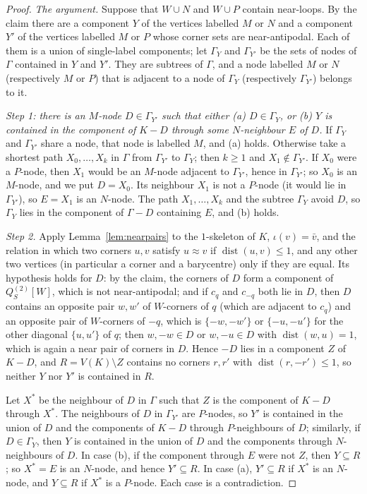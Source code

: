 \documentclass[11pt,letterpaper]{article}
\theoremstyle{definition}
\DeclareMathOperator{\dist}{dist}
\begin{document}
\begin{proof}
\emph{The argument.} Suppose that $W\cup N$ and $W\cup P$ contain near-loops. By the claim there are
a component $Y$ of the vertices labelled $M$ or $N$ and a component $Y'$ of the vertices labelled $M$
or $P$ whose corner sets are near-antipodal. Each of them is a union of single-label components; let
$\Gamma_Y$ and $\Gamma_{Y'}$ be the sets of nodes of $\Gamma$ contained in $Y$ and $Y'$. They are subtrees
of $\Gamma$, and a node labelled $M$ or $N$ (respectively $M$ or $P$) that is adjacent to a node of
$\Gamma_Y$ (respectively $\Gamma_{Y'}$) belongs to it.

\emph{Step 1: there is an $M$-node $D\in\Gamma_{Y'}$ such that either (a) $D\in\Gamma_Y$, or (b) $Y$ is
contained in the component of $K-D$ through some $N$-neighbour $E$ of $D$.} If $\Gamma_Y$ and
$\Gamma_{Y'}$ share a node, that node is labelled $M$, and (a) holds. Otherwise take a shortest path
$X_0,\dots,X_k$ in $\Gamma$ from $\Gamma_{Y'}$ to $\Gamma_Y$; then $k\ge1$ and $X_1\notin\Gamma_{Y'}$. If
$X_0$ were a $P$-node, then $X_1$ would be an $M$-node adjacent to $\Gamma_{Y'}$, hence in $\Gamma_{Y'}$; so
$X_0$ is an $M$-node, and we put $D=X_0$. Its neighbour $X_1$ is not a $P$-node (it would lie in
$\Gamma_{Y'}$), so $E=X_1$ is an $N$-node. The path $X_1,\dots,X_k$ and the subtree $\Gamma_Y$ avoid $D$,
so $\Gamma_Y$ lies in the component of $\Gamma-D$ containing $E$, and (b) holds.

\emph{Step 2.} Apply Lemma~\ref{lem:nearpairs} to the $1$-skeleton of $K$, $\iota(v)=\bar v$, and the
relation in which two corners $u,v$ satisfy $u\approx v$ if $\dist(u,v)\le1$, and any other two vertices
(in particular a corner and a barycentre) only if they are equal. Its hypothesis holds for $D$: by the
claim, the corners of $D$ form a component of $Q^{(2)}_S[W]$, which is not near-antipodal; and if $c_q$ and
$c_{-q}$ both lie in $D$, then $D$ contains an opposite pair $w,w'$ of $W$-corners of $q$ (which are
adjacent to $c_q$) and an opposite pair of $W$-corners of $-q$, which is $\{-w,-w'\}$ or $\{-u,-u'\}$ for
the other diagonal $\{u,u'\}$ of $q$; then $w,-w\in D$ or $w,-u\in D$ with $\dist(w,u)=1$, which is
again a near pair of corners in $D$. Hence $-D$ lies in a component $Z$ of $K-D$, and $R=V(K)\setminus Z$
contains no corners $r,r'$ with $\dist(r,-r')\le1$, so neither $Y$ nor $Y'$ is contained in $R$.

Let $X^*$ be the neighbour of $D$ in $\Gamma$ such that $Z$ is the component of $K-D$ through $X^*$. The
neighbours of $D$ in $\Gamma_{Y'}$ are $P$-nodes, so $Y'$ is contained in the union of $D$ and the
components of $K-D$ through $P$-neighbours of $D$; similarly, if $D\in\Gamma_Y$, then $Y$ is contained in
the union of $D$ and the components through $N$-neighbours of $D$. In case (b), if the component through
$E$ were not $Z$, then $Y\subseteq R$; so $X^*=E$ is an $N$-node, and hence $Y'\subseteq R$. In case (a),
$Y'\subseteq R$ if $X^*$ is an $N$-node, and $Y\subseteq R$ if $X^*$ is a $P$-node. Each case is a
contradiction.
\end{proof}
\end{document}
